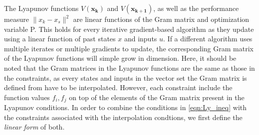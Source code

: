 

The Lyapunov functions $V(\mathbf{x_k})$ and $V(\mathbf{x_{k+1}})$, as well as the performance measure $\|x_k - x_s\|^2$ are linear functions of the Gram matrix and optimization variable P. This holds for every iterative gradient-based algorithm as they update using a linear function of past states $x$ and inputs $u$. If a different algorithm uses multiple iterates or multiple gradients to update, the corresponding Gram matrix of the Lyapunov functions will simple grow in dimension. Here, it should be noted that the Gram matrices in the Lyapunov functions are the same as those in the constraints, as every states and inputs in the vector set the Gram matrix is defined from have to be interpolated. However, each constraint include the function values $f_i, f_j$ on top of the elements of the Gram matrix present in the Lyapunov conditions. In order to combine the conditions in \eqref{eqn:Ly_ineq} with the constraints associated with the interpolation condtions, we first define the \textit{linear form} of both.

